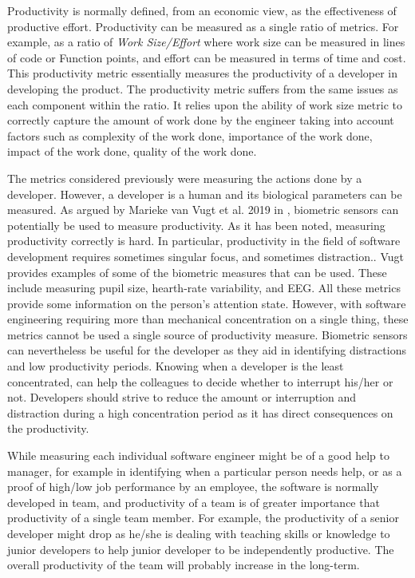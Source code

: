 \documentclass[11pt]{article}
\begin{document}
\par 
Productivity is normally defined, from an economic view, as the effectiveness of productive effort.\cite{Oliveira:2017} Productivity can be measured as a single ratio of metrics. For example, as a ratio of \textit{Work Size/Effort} where work size can be measured in lines of code or Function points, and effort can be measured in terms of time and cost. This productivity metric essentially measures the productivity of a developer in developing the product. The productivity metric suffers from the same issues as each component within the ratio. It relies upon the ability of work size metric to correctly capture the amount of work done by the engineer taking into account factors such as complexity of the work done, importance of the work done, impact of the work done, quality of the work done.

\par 
The metrics considered previously were measuring the actions done by a developer. However, a developer is a human and its biological parameters can be measured. As argued by Marieke van Vugt et al. 2019 in \cite{Vugt2019}, biometric sensors can potentially be used to measure productivity. As it has been noted, measuring productivity correctly is hard. In particular, productivity in the field of software development requires sometimes singular focus, and sometimes distraction.\cite{Vugt2019}. Vugt provides examples of some of the biometric measures that can be used. These include measuring pupil size, hearth-rate variability, and EEG. All these metrics provide some information on the person's attention state. However, with software engineering requiring more than mechanical concentration on a single thing, these metrics cannot be used a single source of productivity measure. Biometric sensors can nevertheless be useful for the developer as they aid in identifying distractions and low productivity periods. Knowing when a developer is the least concentrated, can help the colleagues to decide whether to interrupt his/her or not. Developers should strive to reduce the amount or interruption and distraction during a high concentration period as it has direct consequences on the productivity.

\par 
While measuring each individual software engineer might be of a good help to manager, for example in identifying when a particular person needs help, or as a proof of high/low job performance by an employee, the software is normally developed in team, and productivity of a team is of greater importance that productivity of a single team member. For example, the productivity of a senior developer might drop as he/she is dealing with teaching skills or knowledge to junior developers to help junior developer to be independently productive. The overall productivity of the team will probably increase in the long-term.\cite{Ko2019}
\end{document}
